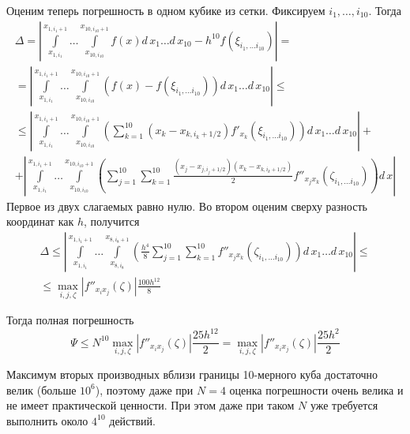 \documentclass[12pt, a4paper]{article}
\begin{document}
Оценим теперь погрешность в одном кубике из сетки. Фиксируем $i_1,\ldots,i_{10}$. Тогда 
\begin{gather*} \Delta = 
\left| \int\limits_{x_{1,i_1}}^{x_{1,i_1 + 1}}\dots\int\limits_{x_{10,i_{10}}}^{x_{10,i_{10} + 1}} 
	f(x) d\,x_1\dots d\, x_{10} - h^{10} f\left(\xi_{i_1,\ldots i_{10}}\right)  \right|
   = \\ =
\left| \int\limits_{x_{1,i_1}}^{x_{1,i_1 + 1}}\dots\int\limits_{x_{10,i_{10}}}^{x_{10,i_{10} + 1}} 
	\left( f(x) - f\left(\xi_{i_1,\ldots i_{10}}\right) \right) d\,x_1\dots d\, x_{10} \right|
	\leqslant \\ \leqslant
\left| \int\limits_{x_{1,i_1}}^{x_{1,i_1 + 1}}\dots\int\limits_{x_{10,i_{10}}}^{x_{10,i_{10} + 1}} 
	\left( 
		\sum\limits_{k=1}^{10}\left( x_k - x_{k,i_k+1/2} \right)f'_{x_k}\left(\xi_{i_1,\ldots i_{10}}\right)
	\right) d\,x_1\dots d\, x_{10} \right|
			+ \\ + 
\left| \int\limits_{x_{1,i_1}}^{x_{1,i_1 + 1}}\dots\int\limits_{x_{10,i_{10}}}^{x_{10,i_{10} + 1}}
	\left(
		\sum\limits_{j=1}^{10} \sum\limits_{k=1}^{10} 
			\frac{\left(x_j-x_{j,i_j+1/2}\right) \left( x_k - x_{k,i_k+1/2} \right) }{2}
			f''_{x_j x_k} \left(\zeta_{{i_1,\ldots i_{10}}}\right) 
	\right) d\,x \right|
\end{gather*}
Первое из двух слагаемых равно нулю. Во втором оценим сверху разность координат как $h$, получится
\begin{gather*}
\Delta \leqslant 
\left| \int\limits_{x_{1,i_1}}^{x_{1,i_1 + 1}}\dots\int\limits_{x_{8,i_{8}}}^{x_{8,i_{8} + 1}}
	\left(
		\frac{h^4}{8}\sum\limits_{j=1}^{10} \sum\limits_{k=1}^{10} 
			f''_{x_j x_k} \left(\zeta_{{i_1,\ldots i_{10}}}\right) 
	\right) d\,x_1\dots d\, x_{10} \right|
	\leqslant \\ \leqslant
	\max\limits_{i,j,\zeta} \left| f''_{x_i x_j}\left( \zeta \right)\right| 
		\frac{100 h^{12}}{8}	
\end{gather*}

Тогда полная погрешность 
\[ 
\Psi \leqslant 
	N^{10}\max\limits_{i,j,\zeta} \left| f''_{x_i x_j}\left( \zeta \right)\right| 
		\frac{25h^{12}}{2} = 
	\max\limits_{i,j,\zeta} \left| f''_{x_i x_j}\left( \zeta \right)\right| 
			\frac{25h^{2}}{2}
\]

Максимум вторых производных вблизи границы 10-мерного куба достаточно велик (больше $10^6$), поэтому даже при $N=4$ оценка погрешности очень велика и не имеет практической ценности. При этом даже при таком $N$ уже требуется выполнить около $4^{10}$ действий.
\end{document}
